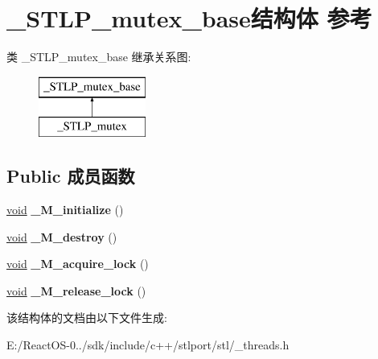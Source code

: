 \hypertarget{struct___s_t_l_p__mutex__base}{}\section{\+\_\+\+S\+T\+L\+P\+\_\+mutex\+\_\+base结构体 参考}
\label{struct___s_t_l_p__mutex__base}
类 \+\_\+\+S\+T\+L\+P\+\_\+mutex\+\_\+base 继承关系图\+:\begin{figure}[H]
\begin{center}
\leavevmode
\includegraphics[height=2.000000cm]{struct___s_t_l_p__mutex__base}
\end{center}
\end{figure}
\subsection*{Public 成员函数}
\begin{DoxyCompactItemize}
\item 
\mbox{\label{struct___s_t_l_p__mutex__base_ae1746de85717c6dc81413833565f6689}} 
\hyperlink{interfacevoid}{void} {\bfseries \+\_\+\+M\+\_\+initialize} ()
\item 
\mbox{\label{struct___s_t_l_p__mutex__base_afc63e4b57d7c6cd9f1b4ddba0c486709}} 
\hyperlink{interfacevoid}{void} {\bfseries \+\_\+\+M\+\_\+destroy} ()
\item 
\mbox{\label{struct___s_t_l_p__mutex__base_a0fcec58e69a1826f1c8bb4f52ea83a1e}} 
\hyperlink{interfacevoid}{void} {\bfseries \+\_\+\+M\+\_\+acquire\+\_\+lock} ()
\item 
\mbox{\label{struct___s_t_l_p__mutex__base_ae0e679451b77d249059c277f5a344360}} 
\hyperlink{interfacevoid}{void} {\bfseries \+\_\+\+M\+\_\+release\+\_\+lock} ()
\end{DoxyCompactItemize}


该结构体的文档由以下文件生成\+:\begin{DoxyCompactItemize}
\item 
E\+:/\+React\+O\+S-\/0../sdk/include/c++/stlport/stl/\+\_\+threads.\+h\end{DoxyCompactItemize}
